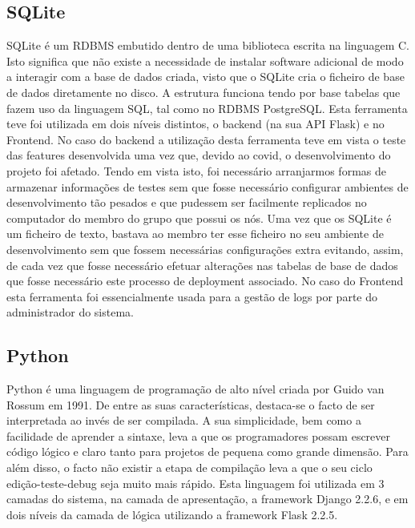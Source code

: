 \subsection{SQLite}
SQLite é um RDBMS embutido dentro de uma biblioteca escrita na linguagem C. Isto significa que não existe a necessidade de instalar software adicional de modo a interagir com a base de dados criada, visto que o SQLite cria o ficheiro de base de dados diretamente no disco.\newline
A estrutura funciona tendo por base tabelas que fazem uso da linguagem SQL, tal como no RDBMS PostgreSQL.\newline
Esta ferramenta teve foi utilizada em dois níveis distintos, o backend (na sua API Flask) e no Frontend.\newline
No caso do backend a utilização desta ferramenta teve em vista o teste das features desenvolvida uma vez que, devido ao covid, o desenvolvimento do projeto foi afetado. Tendo em vista isto, foi necessário arranjarmos formas de armazenar informações de testes sem que fosse necessário configurar ambientes de desenvolvimento tão pesados e que pudessem ser facilmente replicados no computador do membro do grupo que possui os nós. Uma vez que os SQLite é um ficheiro de texto, bastava ao membro ter esse ficheiro no seu ambiente de desenvolvimento sem que fossem necessárias configurações extra evitando, assim, de cada vez que fosse necessário efetuar alterações nas tabelas de base de dados que fosse necessário este processo de deployment associado. 
No caso do Frontend esta ferramenta foi essencialmente usada para a gestão de logs por parte do administrador do sistema.

\subsection{Python}
Python é uma linguagem de programação de alto nível criada por Guido van Rossum em 1991. De entre as suas características, destaca-se o facto de ser interpretada ao invés de ser compilada. \newline
A sua simplicidade, bem como a facilidade de aprender a sintaxe, leva a que os programadores possam escrever código lógico e claro tanto para projetos de pequena como grande dimensão. Para além disso, o facto não existir a etapa de compilação leva a que o seu ciclo edição-teste-debug seja muito mais rápido. \newline
Esta linguagem foi utilizada em 3 camadas do sistema, na camada de apresentação, a framework Django 2.2.6, e em dois níveis da camada de lógica utilizando a framework Flask 2.2.5.


